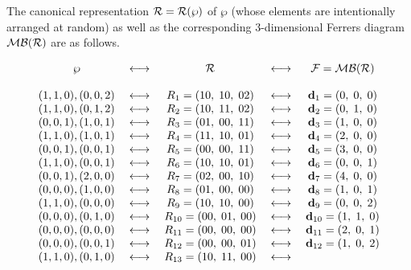 The canonical representation   ${\cal  R}={\cal  R}(\wp)$  of  $\wp$
(whose elements are intentionally arranged at random)
as well as the  corresponding $3$-dimensional Ferrers diagram  ${\cal  
MB}({\cal  R})$  are as follows. 

$$
\begin{array}{ccccc}
\wp &\;   \longleftrightarrow   &\;
{\cal  R}&\;   \longleftrightarrow   &\;
{\cal F}={\cal  MB}({\cal  R})\\
\ &\ &\ &\ &\ \\
(1,1,0),(0,0,2)
&\;   \longleftrightarrow   &\;
R_1=(10,\; 10,\; 02)&\; \longleftrightarrow &\;
{\bf d}_1=(0,\;  0,\; 0)\\
(1,1,0),(0,1,2)
&\;   \longleftrightarrow   &\;
R_2=(10,\; 11,\; 02)&\; \longleftrightarrow &\;
{\bf d}_2=(0,\; 1,\; 0)\\
(0,0,1),(1,0,1)
&\;   \longleftrightarrow   &\;
R_3=(01,\; 00,\; 11)&\; \longleftrightarrow &\;
{\bf d}_3=(1,\; 0,\; 0)\\
(1,1,0),(1,0,1)
&\;   \longleftrightarrow   &\;
R_4=(11,\; 10,\; 01)&\; \longleftrightarrow &\;
{\bf d}_4=(2,\; 0,\; 0)\\
(0,0,1),(0,0,1)
&\;   \longleftrightarrow   &\;
R_5=(00,\; 00,\; 11)&\; \longleftrightarrow &\;
{\bf d}_5=(3,\; 0,\; 0)\\
(1,1,0),(0,0,1)
&\;   \longleftrightarrow   &\;
R_6=(10,\; 10,\; 01)&\; \longleftrightarrow &\;
{\bf d}_6=(0,\; 0,\; 1)\\
(0,0,1),(2,0,0)
&\;   \longleftrightarrow   &\;
R_7=(02,\; 00,\; 10)&\; \longleftrightarrow &\;
{\bf d}_7=(4,\; 0,\; 0)\\
(0,0,0),(1,0,0)
&\;   \longleftrightarrow   &\;
R_8=(01,\; 00,\; 00)&\; \longleftrightarrow &\;
{\bf d}_8=(1,\; 0,\; 1)\\
(1,1,0),(0,0,0)
&\;   \longleftrightarrow   &\;
R_9=(10,\; 10,\; 00)&\; \longleftrightarrow &\;
{\bf d}_9=(0,\; 0,\; 2)\\
(0,0,0),(0,1,0)
&\;   \longleftrightarrow   &\;
R_{10}=(00,\; 01,\; 00)&\; \longleftrightarrow &\;
{\bf d}_{10}=(1,\; 1,\; 0)\\
(0,0,0),(0,0,0)
&\;   \longleftrightarrow   &\;
R_{11}=(00,\; 00,\; 00)&\; \longleftrightarrow &\;
{\bf d}_{11}=(2,\; 0,\; 1)\\
(0,0,0),(0,0,1)
&\;   \longleftrightarrow   &\;
R_{12}=(00,\; 00,\; 01)&\; \longleftrightarrow &\;
{\bf d}_{12}=(1,\; 0,\; 2)\\
(1,1,0),(0,1,0)
&\;   \longleftrightarrow   &\;
R_{13}=(10,\; 11,\; 00)&\; \longleftrightarrow &\;

\end{array}$$
